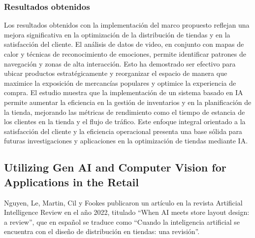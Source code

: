 

\subsubsection{Resultados obtenidos}
Los resultados obtenidos con la implementación del marco propuesto reflejan una mejora significativa en la optimización de la distribución de tiendas y en la satisfacción del cliente. El análisis de datos de video, en conjunto con mapas de calor y técnicas de reconocimiento de emociones, permite identificar patrones de navegación y zonas de alta interacción. Esto ha demostrado ser efectivo para ubicar productos estratégicamente y reorganizar el espacio de manera que maximice la exposición de mercancías populares y optimice la experiencia de compra. El estudio muestra que la implementación de un sistema basado en IA permite aumentar la eficiencia en la gestión de inventarios y en la planificación de la tienda, mejorando las métricas de rendimiento como el tiempo de estancia de los clientes en la tienda y el flujo de tráfico. Este enfoque integral orientado a la satisfacción del cliente y la eficiencia operacional presenta una base sólida para futuras investigaciones y aplicaciones en la optimización de tiendas mediante IA.


\subsection{Utilizing Gen AI and Computer Vision for Applications in the Retail}
Nguyen, Le, Martin, Cil y Fookes publicaron un artículo en la revista Artificial Intelligence Review en el año 2022, titulado “When AI meets store layout design: a review”, que en español se traduce como “Cuando la inteligencia artificial se encuentra con el diseño de distribución en tiendas: una revisión”.

